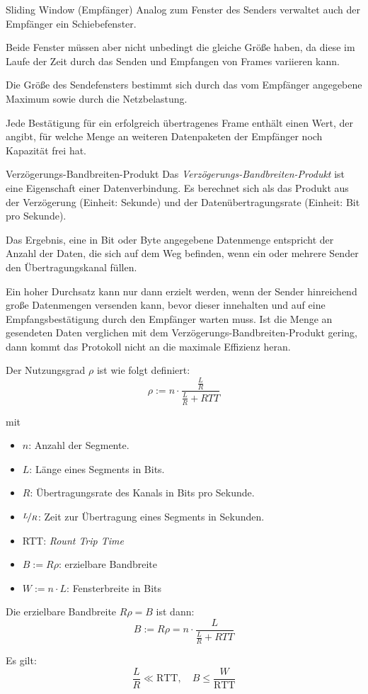 \begin{defi}{Sliding Window (Empfänger)}
    Analog zum Fenster des Senders verwaltet auch der Empfänger ein Schiebefenster.

    Beide Fenster müssen aber nicht unbedingt die gleiche Größe haben, da diese im Laufe der Zeit durch das Senden und Empfangen von Frames variieren kann.

    Die Größe des Sendefensters bestimmt sich durch das vom Empfänger angegebene Maximum sowie durch die Netzbelastung.

    Jede Bestätigung für ein erfolgreich übertragenes Frame enthält einen Wert, der angibt, für welche Menge an weiteren Datenpaketen der Empfänger noch Kapazität frei hat.
\end{defi}

\begin{defi}{Verzögerungs-Bandbreiten-Produkt}
    Das \emph{Verzögerungs-Bandbreiten-Produkt}  ist eine Eigenschaft einer Datenverbindung. Es berechnet sich als das Produkt aus der Verzögerung (Einheit: Sekunde) und der Datenübertragungsrate (Einheit: Bit pro Sekunde).

    Das Ergebnis, eine in Bit oder Byte angegebene Datenmenge entspricht der Anzahl der Daten, die sich auf dem Weg befinden, wenn ein oder mehrere Sender den Übertragungskanal füllen.

    Ein hoher Durchsatz kann nur dann erzielt werden, wenn der Sender hinreichend große Datenmengen versenden kann, bevor dieser innehalten und auf eine Empfangsbestätigung durch den Empfänger warten muss.
    Ist die Menge an gesendeten Daten verglichen mit dem Verzögerungs-Bandbreiten-Produkt gering, dann kommt das Protokoll nicht an die maximale Effizienz heran.

    Der Nutzungsgrad $\rho$ ist wie folgt definiert:
    \[
        \rho := n \cdot \frac{\frac{L}{R}}{\frac{L}{R} + RTT}
    \]

    mit
    \begin{itemize}
        \item $n$: Anzahl der Segmente.
        \item $L$: Länge eines Segments in Bits.
        \item $R$: Übertragungsrate des Kanals in Bits pro Sekunde.
        \item $\nicefrac{L}{R}$: Zeit zur Übertragung eines Segments in Sekunden.
        \item RTT: \emph{Rount Trip Time}
        \item $B := R\rho$: erzielbare Bandbreite
        \item $W := n \cdot L$: Fensterbreite in Bits
    \end{itemize}

    Die erzielbare Bandbreite $R\rho = B$ ist dann:
    \[
        B := R\rho = n \cdot \frac{L}{\frac{L}{R} + RTT}
    \]

    Es gilt:
    \[
        \frac{L}{R} \ll \text{RTT}, \quad B \leq \frac{W}{\text{RTT}}
    \]
\end{defi}

